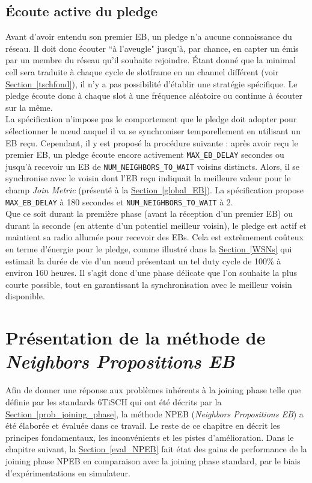 \documentclass[]{report}
\newcommand{\wordlink}[2]{\hyperref[#2]{#1~\ref{#2}}}
\begin{document}
\subsection{Écoute active du pledge}

Avant d'avoir entendu son premier EB, un pledge n'a aucune connaissance du réseau. Il doit donc écouter ``à l'aveugle" jusqu'à, par chance, en capter un émis par un membre du réseau qu'il souhaite rejoindre. Étant donné que la minimal cell sera traduite à chaque cycle de slotframe en un channel différent (voir \wordlink{Section}{tschfond}), il n'y a pas possibilité d'établir une stratégie spécifique. Le pledge écoute donc à chaque slot à une fréquence aléatoire ou continue à écouter sur la même.\\

La spécification \cite{rfc8180} n'impose pas le comportement que le pledge doit adopter pour sélectionner le nœud auquel il va se synchroniser temporellement en utilisant un EB reçu. Cependant, il y est proposé la procédure suivante : après avoir reçu le premier EB, un pledge écoute encore activement \texttt{MAX\_EB\_DELAY} secondes ou jusqu'à recevoir un EB de \texttt{NUM\_NEIGHBORS\_TO\_WAIT} voisins distincts. Alors, il se synchronise avec le voisin dont l'EB reçu indiquait la meilleure valeur pour le champ \textit{Join Metric} (présenté à la \wordlink{Section}{global_EB}). La spécification \cite{rfc8180} propose \texttt{MAX\_EB\_DELAY} à 180 secondes et \texttt{NUM\_NEIGHBORS\_TO\_WAIT} à 2.\\

Que ce soit durant la première phase (avant la réception d'un premier EB) ou durant la seconde (en attente d'un potentiel meilleur voisin), le pledge est actif et maintient sa radio allumée pour recevoir des EBs. Cela est extrêmement coûteux en terme d'énergie pour le pledge, comme illustré dans la \wordlink{Section}{WSNs} qui estimait la durée de vie d'un nœud présentant un tel duty cycle de 100\% à environ 160 heures. Il s'agit donc d'une phase délicate que l'on souhaite la plus courte possible, tout en garantissant la synchronisation avec le meilleur voisin disponible.

\newpage

\section{Présentation de la méthode de \textit{Neighbors Propositions EB}}
\label{intuition_NPEB}

Afin de donner une réponse aux problèmes inhérents à la joining phase telle que définie par les standards 6TiSCH qui ont été décrits par la \wordlink{Section}{prob_joining_phase}, la méthode NPEB (\textit{Neighbors Propositions EB}) a été élaborée et évaluée dans ce travail. Le reste de ce chapitre en décrit les principes fondamentaux, les inconvénients et les pistes d'amélioration. Dans le chapitre suivant, la \wordlink{Section}{eval_NPEB} fait état des gains de performance de la joining phase NPEB en comparaison avec la joining phase standard, par le biais d'expérimentations en simulateur.
\end{document}
